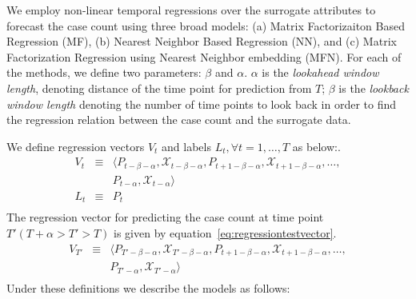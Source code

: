 
We employ non-linear temporal regressions over the surrogate attributes to forecast the
case count using three broad models:
(a) Matrix Factorizaiton Based Regression (MF),
(b) Nearest Neighbor Based Regression (NN),  and
(c)  Matrix Factorization Regression using Nearest Neighbor embedding (MFN).
For each of the methods, we define two parameters: $\beta$ and $\alpha$. 
$\alpha$ is the {\it lookahead window length}, denoting distance of the time point for prediction from $T$;
$\beta$ is the {\it lookback window length} denoting the number of time points to look back
in order to find the regression relation between the case count and the surrogate data.

We define regression vectors $V_t$  and 
labels $L_t,  \forall t = 1,\dots, T$ as below:.
\vspace{-1em}
\begin{equation*}
  \label{eq:regressionvector}
  \begin{array}{lcl}
    V_t & \equiv & \langle P_{t-\beta - \alpha}, \mathcal{X}_{t-\beta - \alpha}, P_{t + 1 -\beta-\alpha}, \mathcal{X}_{t + 1 - \beta-\alpha}, \dots, \\
        &        & P_{t-\alpha},\mathcal{X}_{t-\alpha} \rangle \\
    L_t & \equiv & P_{t}\\
  \end{array}
\end{equation*}
The regression vector for predicting the case count at time point $T' (T +
\alpha > T' > T)$ is given by equation~\ref{eq:regressiontestvector}.
\begin{equation}
  \label{eq:regressiontestvector}
  \begin{array}{lcl}
    V_{T'} & \equiv & \langle P_{T'-\beta - \alpha}, \mathcal{X}_{T'-\beta - \alpha}, P_{t + 1 -\beta-\alpha}, \mathcal{X}_{t + 1 - \beta-\alpha}, \dots, \\
           &        & P_{T'-\alpha},\mathcal{X}_{T'-\alpha} \rangle \\
  \end{array}
\end{equation}
\noindent
Under these definitions we describe the models as follows:
